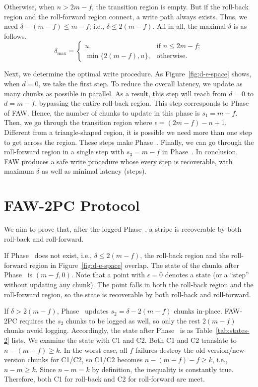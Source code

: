 \documentclass[letterpaper,10pt,twocolumn]{article}
\def\protocol/{FAW}
\begin{document}
Otherwise, when $n > 2m - f$, the transition region is empty. But if the
roll-back region and the roll-forward region connect, a write path 
always exists. Thus, we need
$\delta - (m - f) \le m - f$, i.e., $\delta \le 2(m
- f)$. All in all, the maximal $\delta$ is as follows.
\begin{equation}
\delta_{\max} =
\begin{cases}
u, & \text{if } n \le 2m-f;\\
\min\{2(m-f), u\}, & \text{otherwise.}
\end{cases}
\label{eq:delta}
\end{equation}

Next, we determine the optimal write procedure.
As Figure~\ref{fig:d-e-space} shows, when $d = 0$, we take the first step. To reduce the overall latency, we update as many chunks as possible in parallel.
As a result, this step will reach from $d=0$ to $d=m-f$, bypassing the entire roll-back region.
This step corresponds to Phase~ of \protocol/.
Hence, the number of chunks to update in this phase is $s_1=m-f$.
Then, we go through the transition region where $\epsilon = (2m - f) - n + 1$.
Different from a triangle-shaped region, it is possible we need more than one
step to get across the region.
These steps make Phase~.
Finally, we can go through the roll-forward region in a single step with $s_3=m-f$ in Phase~.
In conclusion, \protocol/ produces a safe write procedure whose every step is recoverable, with maximum $\delta$ as well as minimal latency (steps).

\section{\protocol/-2PC Protocol}
\label{sec:2pc}

We aim to prove that, after the logged Phase~, a stripe is recoverable by both roll-back and roll-forward.

If Phase~ does not exist, i.e., $\delta \le 2(m-f)$, the roll-back region and the roll-forward region in Figure~\ref{fig:d-e-space} overlap.
The state of the chunks after Phase~ is $(m-f,0)$.
Note that a point with $\epsilon=0$ denotes a state (or a ``step'' without updating any chunk).
The point falls in both the roll-back region and the roll-forward region, so the state is recoverable by both roll-back and roll-forward.

If $\delta > 2(m-f)$, Phase~ updates $s_2=\delta-2(m-f)$ chunks in-place.
\protocol/-2PC requires the $s_2$ chunks to be logged as well, so only the rest $2(m-f)$ chunks avoid logging.
Accordingly, the state after Phase~ is as Table~\ref{tab:states-2} lists.
We examine the state with C1 and C2.
Both C1 and C2 translate to $n-(m-f) \ge k$.
In the worst case, all $f$ failures destroy the old-version/new-version chunks for C1/C2, so C1/C2 becomes $n-(m-f)-f \ge k$, i.e., $n-m \ge k$.
Since $n-m=k$ by definition, the inequality is constantly true.
Therefore, both C1 for roll-back and C2 for roll-forward are meet.
\end{document}
